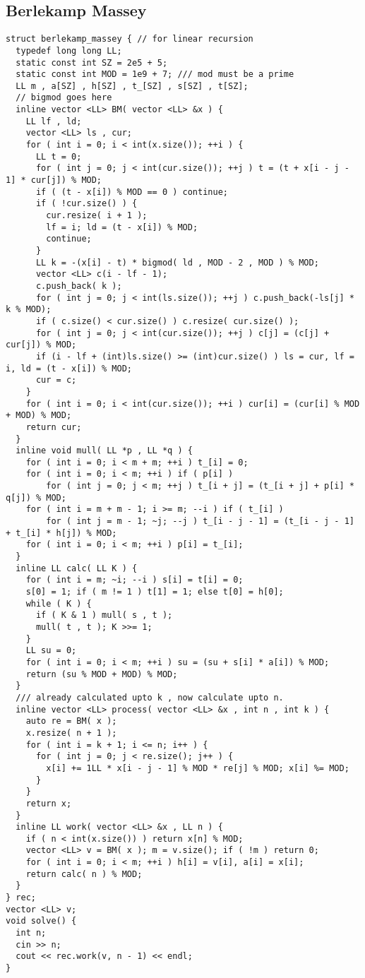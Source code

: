 \documentclass[10pt,a4paper,onesided]{article}
\begin{document}
\begin{multicols*}{3}
\subsection{Berlekamp Massey}
\begin{lstlisting}
struct berlekamp_massey { // for linear recursion
  typedef long long LL;
  static const int SZ = 2e5 + 5;
  static const int MOD = 1e9 + 7; /// mod must be a prime
  LL m , a[SZ] , h[SZ] , t_[SZ] , s[SZ] , t[SZ];
  // bigmod goes here
  inline vector <LL> BM( vector <LL> &x ) {
    LL lf , ld;
    vector <LL> ls , cur;
    for ( int i = 0; i < int(x.size()); ++i ) {
      LL t = 0;
      for ( int j = 0; j < int(cur.size()); ++j ) t = (t + x[i - j - 1] * cur[j]) % MOD;
      if ( (t - x[i]) % MOD == 0 ) continue;
      if ( !cur.size() ) {
        cur.resize( i + 1 );
        lf = i; ld = (t - x[i]) % MOD;
        continue;
      }
      LL k = -(x[i] - t) * bigmod( ld , MOD - 2 , MOD ) % MOD;
      vector <LL> c(i - lf - 1);
      c.push_back( k );
      for ( int j = 0; j < int(ls.size()); ++j ) c.push_back(-ls[j] * k % MOD);
      if ( c.size() < cur.size() ) c.resize( cur.size() );
      for ( int j = 0; j < int(cur.size()); ++j ) c[j] = (c[j] + cur[j]) % MOD;
      if (i - lf + (int)ls.size() >= (int)cur.size() ) ls = cur, lf = i, ld = (t - x[i]) % MOD;
      cur = c;
    }
    for ( int i = 0; i < int(cur.size()); ++i ) cur[i] = (cur[i] % MOD + MOD) % MOD;
    return cur;
  }
  inline void mull( LL *p , LL *q ) {
    for ( int i = 0; i < m + m; ++i ) t_[i] = 0;
    for ( int i = 0; i < m; ++i ) if ( p[i] )
        for ( int j = 0; j < m; ++j ) t_[i + j] = (t_[i + j] + p[i] * q[j]) % MOD;
    for ( int i = m + m - 1; i >= m; --i ) if ( t_[i] )
        for ( int j = m - 1; ~j; --j ) t_[i - j - 1] = (t_[i - j - 1] + t_[i] * h[j]) % MOD;
    for ( int i = 0; i < m; ++i ) p[i] = t_[i];
  }
  inline LL calc( LL K ) {
    for ( int i = m; ~i; --i ) s[i] = t[i] = 0;
    s[0] = 1; if ( m != 1 ) t[1] = 1; else t[0] = h[0];
    while ( K ) {
      if ( K & 1 ) mull( s , t );
      mull( t , t ); K >>= 1;
    }
    LL su = 0;
    for ( int i = 0; i < m; ++i ) su = (su + s[i] * a[i]) % MOD;
    return (su % MOD + MOD) % MOD;
  }
  /// already calculated upto k , now calculate upto n.
  inline vector <LL> process( vector <LL> &x , int n , int k ) {
    auto re = BM( x );
    x.resize( n + 1 );
    for ( int i = k + 1; i <= n; i++ ) {
      for ( int j = 0; j < re.size(); j++ ) {
        x[i] += 1LL * x[i - j - 1] % MOD * re[j] % MOD; x[i] %= MOD;
      }
    }
    return x;
  }
  inline LL work( vector <LL> &x , LL n ) {
    if ( n < int(x.size()) ) return x[n] % MOD;
    vector <LL> v = BM( x ); m = v.size(); if ( !m ) return 0;
    for ( int i = 0; i < m; ++i ) h[i] = v[i], a[i] = x[i];
    return calc( n ) % MOD;
  }
} rec;
vector <LL> v;
void solve() {
  int n;
  cin >> n;
  cout << rec.work(v, n - 1) << endl;
}


\end{lstlisting}
\end{multicols*}
\end{document}
